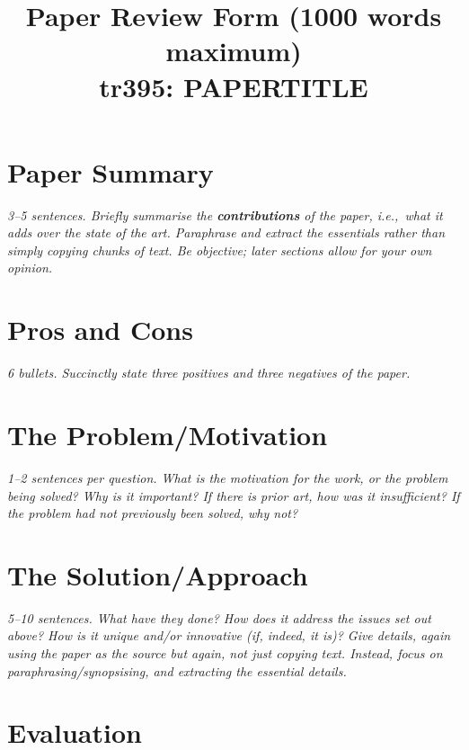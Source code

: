 \documentclass[11pt]{article}
\begin{document}
\title{Paper Review Form (1000 words maximum)\\
    tr395: PAPERTITLE}

\maketitle

\section*{Paper Summary}

\textsl{3--5 sentences. Briefly summarise the {\bf contributions} of the paper, i.e.,~what it adds over the state of the art. Paraphrase and extract the essentials rather than simply copying chunks of text. Be objective; later sections allow for your own opinion.}


\section*{Pros and Cons}

\textsl{6 bullets. Succinctly state three positives and three negatives of the paper.}


\section*{The Problem/Motivation}

\textsl{1--2 sentences per question. What is the motivation for the work, or the problem being solved? Why is it important? If there is prior art, how was it insufficient? If the problem had not previously been solved, why not?}


\section*{The Solution/Approach}

\textsl{5--10 sentences. What have they done? How does it address the issues set out above? How is it unique and/or innovative (if, indeed, it is)? Give details, again using the paper as the source but again, not just copying text. Instead, focus on paraphrasing/synopsising, and extracting the essential details.}


\section*{Evaluation}
\end{document}
